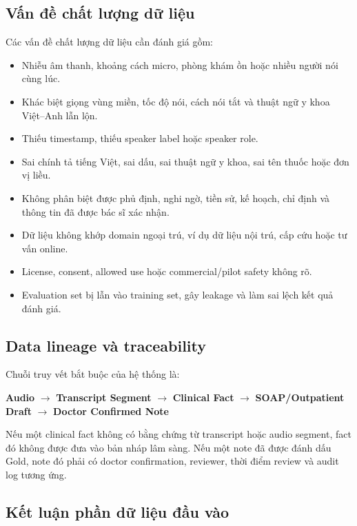 \documentclass[12pt,a4paper]{article}
\begin{document}
\subsection{Vấn đề chất lượng dữ liệu}

Các vấn đề chất lượng dữ liệu cần đánh giá gồm:

\begin{itemize}
    \item Nhiễu âm thanh, khoảng cách micro, phòng khám ồn hoặc nhiều người nói cùng lúc.
    \item Khác biệt giọng vùng miền, tốc độ nói, cách nói tắt và thuật ngữ y khoa Việt--Anh lẫn lộn.
    \item Thiếu timestamp, thiếu speaker label hoặc speaker role.
    \item Sai chính tả tiếng Việt, sai dấu, sai thuật ngữ y khoa, sai tên thuốc hoặc đơn vị liều.
    \item Không phân biệt được phủ định, nghi ngờ, tiền sử, kế hoạch, chỉ định và thông tin đã được bác sĩ xác nhận.
    \item Dữ liệu không khớp domain ngoại trú, ví dụ dữ liệu nội trú, cấp cứu hoặc tư vấn online.
    \item License, consent, allowed use hoặc commercial/pilot safety không rõ.
    \item Evaluation set bị lẫn vào training set, gây leakage và làm sai lệch kết quả đánh giá.
\end{itemize}

\subsection{Data lineage và traceability}

Chuỗi truy vết bắt buộc của hệ thống là:

\begin{center}
\textbf{Audio} $\rightarrow$ \textbf{Transcript Segment} $\rightarrow$ \textbf{Clinical Fact} $\rightarrow$ \textbf{SOAP/Outpatient Draft} $\rightarrow$ \textbf{Doctor Confirmed Note}
\end{center}

Nếu một clinical fact không có bằng chứng từ transcript hoặc audio segment, fact đó không được đưa vào bản nháp lâm sàng. Nếu một note đã được đánh dấu Gold, note đó phải có doctor confirmation, reviewer, thời điểm review và audit log tương ứng.

\subsection{Kết luận phần dữ liệu đầu vào}
\end{document}
